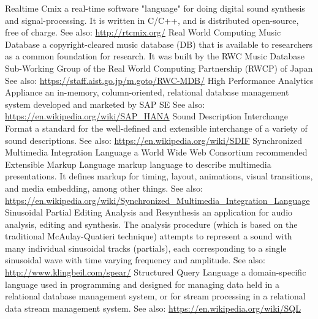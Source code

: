 	{Realtime Cmix}
	{a real-time software "language" for doing digital sound synthesis and signal-processing. It is written in C/C++, and is distributed open-source, free of charge.  See also: \url{http://rtcmix.org/}}
	{Real World Computing Music Database}
	{a copyright-cleared music database (DB) that is available to researchers as a common foundation for research. It was built by the RWC Music Database Sub-Working Group of the Real World Computing Partnership (RWCP) of Japan See also: \url{https://staff.aist.go.jp/m.goto/RWC-MDB/}}
	{High Performance Analytics Appliance}
	{an in-memory, column-oriented, relational database management system developed and marketed by SAP SE See also: \url{https://en.wikipedia.org/wiki/SAP_HANA}}
	{Sound Description Interchange Format}
	{a standard for the well-defined and extensible interchange of a variety of sound descriptions. See also: \url{https://en.wikipedia.org/wiki/SDIF}}
	{Synchronized Multimedia Integration Language}
	{a World Wide Web Consortium recommended Extensible Markup Language markup language to describe multimedia presentations. It defines markup for timing, layout, animations, visual transitions, and media embedding, among other things.  See also: \url{https://en.wikipedia.org/wiki/Synchronized_Multimedia_Integration_Language}}
	{Sinusoidal Partial Editing Analysis and Resynthesis}
	{an application for audio analysis, editing and synthesis. The analysis procedure (which is based on the traditional McAulay-Quatieri technique) attempts to represent a sound with many individual sinusoidal tracks (partials), each corresponding to a single sinusoidal wave with time varying frequency and amplitude. See also: \url{http://www.klingbeil.com/spear/}}
	{Structured Query Language}
	{a domain-specific language used in programming and designed for managing data held in a relational database management system, or for stream processing in a relational data stream management system. See also: \url{https://en.wikipedia.org/wiki/SQL}}
